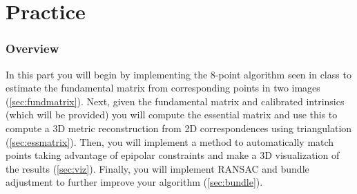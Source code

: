 
\part{Practice}
\label{part:practice}

\section{Overview}

In this part you will begin by implementing the 8-point algorithm seen in class to estimate the fundamental matrix from corresponding points in two images (\autoref{sec:fundmatrix}).  Next, given the fundamental matrix and calibrated intrinsics (which will be provided) you will compute the essential matrix and use this to compute a 3D metric reconstruction from 2D correspondences using triangulation (\autoref{sec:essmatrix}). Then, you will implement a method to automatically match points taking advantage of epipolar constraints and make a 3D visualization of the results (\autoref{sec:viz}). Finally, you will implement RANSAC and bundle adjustment to further improve your algorithm (\autoref{sec:bundle}).